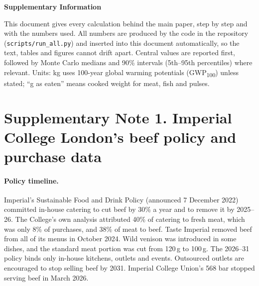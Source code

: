 \documentclass[10pt]{article}
\begin{document}
\begin{center}
{\sffamily\bfseries\Large Supplementary Information\par}
\vspace{4pt}
{\sffamily\large \PaperTitle\par}
\vspace{6pt}
{\sffamily \PaperAuthor\par}
\end{center}

\noindent This document gives every calculation behind the main paper, step by
step and with the numbers used. All numbers are produced by the code in the
repository (\texttt{scripts/run\_all.py}) and inserted into this document
automatically, so the text, tables and figures cannot drift apart. Central
values are reported first, followed by Monte Carlo medians and 90\% intervals
(5th--95th percentiles) where relevant. Units: kg \COtwoe{} uses
100-year global warming potentials (GWP\textsubscript{100}) unless stated; ``g as
eaten'' means cooked weight for meat, fish and pulses.

{\small\tableofcontents}

\section{Supplementary Note 1. Imperial College London's beef policy and purchase data}
\label{si:imperial}

\paragraph{Policy timeline.} Imperial's Sustainable Food and Drink Policy
(announced 7 December 2022) committed in-house catering to cut beef by 30\% a
year and to remove it by 2025--26\cite{imperial2022policy}. The College's
own analysis attributed 40\% of catering \COtwoe{} to fresh meat, which was only
8\% of purchases, and 38\% of meat \COtwoe{} to beef\cite{imperial2024beef}.
Taste Imperial removed beef from all of its menus in October
2024\cite{imperial2024beef}. Wild venison was introduced in some dishes, and the
standard meat portion was cut from 120\,g to 100\,g\cite{imperial2026progress}.
The 2026--31 policy binds only in-house kitchens, outlets and events. Outsourced
outlets are encouraged to stop selling beef by 2031\cite{imperial2025policy}.
Imperial College Union's 568 bar stopped serving beef in March 2026\cite{felix2026five}.
\end{document}
